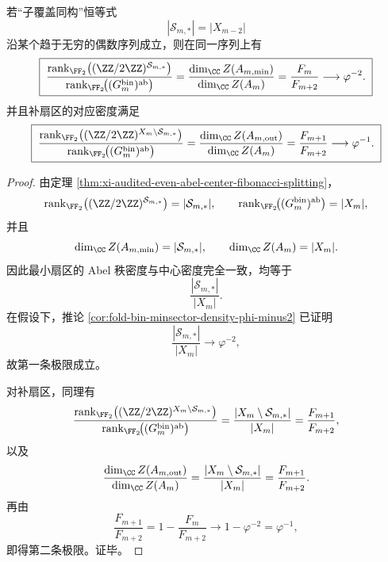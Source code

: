 \begin{theorem}\label{thm:xi-audited-even-minsector-algebraic-density-golden-splitting}
若“子覆盖同构”恒等式
\[
|\mathcal S_{m,*}|=|X_{m-2}|
\]
沿某个趋于无穷的偶数序列成立，则在同一序列上有
\[
\boxed{\;
\frac{
\operatorname{rank}_{\FF_2}\bigl((\ZZ/2\ZZ)^{\mathcal S_{m,*}}\bigr)
}{
\operatorname{rank}_{\FF_2}\!\bigl((G_m^{\mathrm{bin}})^{\mathrm{ab}}\bigr)
}
=
\frac{\dim_{\CC}Z(A_{m,\min})}{\dim_{\CC}Z(A_m)}
=
\frac{F_m}{F_{m+2}}
\longrightarrow
\varphi^{-2}.\;}
\]
并且补扇区的对应密度满足
\[
\boxed{\;
\frac{
\operatorname{rank}_{\FF_2}\bigl((\ZZ/2\ZZ)^{X_m\setminus\mathcal S_{m,*}}\bigr)
}{
\operatorname{rank}_{\FF_2}\!\bigl((G_m^{\mathrm{bin}})^{\mathrm{ab}}\bigr)
}
=
\frac{\dim_{\CC}Z(A_{m,\mathrm{out}})}{\dim_{\CC}Z(A_m)}
=
\frac{F_{m+1}}{F_{m+2}}
\longrightarrow
\varphi^{-1}.\;}
\]
\end{theorem}
\begin{proof}
由定理 \ref{thm:xi-audited-even-abel-center-fibonacci-splitting}，
\[
\operatorname{rank}_{\FF_2}\bigl((\ZZ/2\ZZ)^{\mathcal S_{m,*}}\bigr)
=
|\mathcal S_{m,*}|,
\qquad
\operatorname{rank}_{\FF_2}\!\bigl((G_m^{\mathrm{bin}})^{\mathrm{ab}}\bigr)
=
|X_m|,
\]
并且
\[
\dim_{\CC}Z(A_{m,\min})=|\mathcal S_{m,*}|,
\qquad
\dim_{\CC}Z(A_m)=|X_m|.
\]
因此最小扇区的 Abel 秩密度与中心密度完全一致，均等于
\[
\frac{|\mathcal S_{m,*}|}{|X_m|}.
\]
在假设下，推论 \ref{cor:fold-bin-minsector-density-phi-minus2} 已证明
\[
\frac{|\mathcal S_{m,*}|}{|X_m|}
\longrightarrow
\varphi^{-2},
\]
故第一条极限成立。

对补扇区，同理有
\[
\frac{
\operatorname{rank}_{\FF_2}\bigl((\ZZ/2\ZZ)^{X_m\setminus\mathcal S_{m,*}}\bigr)
}{
\operatorname{rank}_{\FF_2}\!\bigl((G_m^{\mathrm{bin}})^{\mathrm{ab}}\bigr)
}
=
\frac{|X_m\setminus\mathcal S_{m,*}|}{|X_m|}
=
\frac{F_{m+1}}{F_{m+2}},
\]
以及
\[
\frac{\dim_{\CC}Z(A_{m,\mathrm{out}})}{\dim_{\CC}Z(A_m)}
=
\frac{|X_m\setminus\mathcal S_{m,*}|}{|X_m|}
=
\frac{F_{m+1}}{F_{m+2}}.
\]
再由
\[
\frac{F_{m+1}}{F_{m+2}}
=
1-\frac{F_m}{F_{m+2}}
\longrightarrow
1-\varphi^{-2}
=
\varphi^{-1},
\]
即得第二条极限。证毕。
\end{proof}

